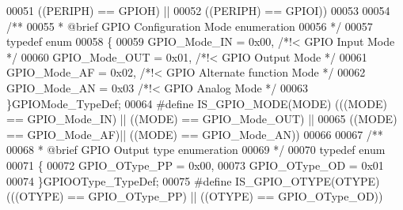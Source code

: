 \begin{DoxyCode}
00051                                     \textcolor{preprocessor}{(}\textcolor{preprocessor}{(}\textcolor{preprocessor}{PERIPH}\textcolor{preprocessor}{)} \textcolor{preprocessor}{==} GPIOH\textcolor{preprocessor}{)} \textcolor{preprocessor}{||}
00052                                     \textcolor{preprocessor}{(}\textcolor{preprocessor}{(}\textcolor{preprocessor}{PERIPH}\textcolor{preprocessor}{)} \textcolor{preprocessor}{==} GPIOI\textcolor{preprocessor}{)}\textcolor{preprocessor}{)}
00053 
00054 \textcolor{comment}{/** }
00055 \textcolor{comment}{  * @brief  GPIO Configuration Mode enumeration }
00056 \textcolor{comment}{  */}
00057 \textcolor{keyword}{typedef} \textcolor{keyword}{enum}
00058 \{
00059   GPIO_Mode_IN   = 0x00, \textcolor{comment}{/*!< GPIO Input Mode */}
00060   GPIO_Mode_OUT  = 0x01, \textcolor{comment}{/*!< GPIO Output Mode */}
00061   GPIO_Mode_AF   = 0x02, \textcolor{comment}{/*!< GPIO Alternate function Mode */}
00062   GPIO_Mode_AN   = 0x03  \textcolor{comment}{/*!< GPIO Analog Mode */}
00063 \}GPIOMode\_TypeDef;
00064 \textcolor{preprocessor}{#}\textcolor{preprocessor}{define} \textcolor{preprocessor}{IS\_GPIO\_MODE}\textcolor{preprocessor}{(}\textcolor{preprocessor}{MODE}\textcolor{preprocessor}{)} \textcolor{preprocessor}{(}\textcolor{preprocessor}{(}\textcolor{preprocessor}{(}\textcolor{preprocessor}{MODE}\textcolor{preprocessor}{)} \textcolor{preprocessor}{==} \textcolor{preprocessor}{GPIO\_Mode\_IN}\textcolor{preprocessor}{)}  \textcolor{preprocessor}{||} \textcolor{preprocessor}{(}\textcolor{preprocessor}{(}\textcolor{preprocessor}{MODE}\textcolor{preprocessor}{)} \textcolor{preprocessor}{==} \textcolor{preprocessor}{GPIO\_Mode\_OUT}\textcolor{preprocessor}{)} \textcolor{preprocessor}{||}
00065                             \textcolor{preprocessor}{(}\textcolor{preprocessor}{(}\textcolor{preprocessor}{MODE}\textcolor{preprocessor}{)} \textcolor{preprocessor}{==} \textcolor{preprocessor}{GPIO\_Mode\_AF}\textcolor{preprocessor}{)}\textcolor{preprocessor}{||} \textcolor{preprocessor}{(}\textcolor{preprocessor}{(}\textcolor{preprocessor}{MODE}\textcolor{preprocessor}{)} \textcolor{preprocessor}{==} \textcolor{preprocessor}{GPIO\_Mode\_AN}\textcolor{preprocessor}{)}\textcolor{preprocessor}{)}
00066 
00067 \textcolor{comment}{/** }
00068 \textcolor{comment}{  * @brief  GPIO Output type enumeration }
00069 \textcolor{comment}{  */}
00070 \textcolor{keyword}{typedef} \textcolor{keyword}{enum}
00071 \{
00072   GPIO_OType_PP = 0x00,
00073   GPIO_OType_OD = 0x01
00074 \}GPIOOType\_TypeDef;
00075 \textcolor{preprocessor}{#}\textcolor{preprocessor}{define} \textcolor{preprocessor}{IS\_GPIO\_OTYPE}\textcolor{preprocessor}{(}\textcolor{preprocessor}{OTYPE}\textcolor{preprocessor}{)} \textcolor{preprocessor}{(}\textcolor{preprocessor}{(}\textcolor{preprocessor}{(}\textcolor{preprocessor}{OTYPE}\textcolor{preprocessor}{)} \textcolor{preprocessor}{==} \textcolor{preprocessor}{GPIO\_OType\_PP}\textcolor{preprocessor}{)} \textcolor{preprocessor}{||} \textcolor{preprocessor}{(}\textcolor{preprocessor}{(}\textcolor{preprocessor}{OTYPE}\textcolor{preprocessor}{)} \textcolor{preprocessor}{==} \textcolor{preprocessor}{GPIO\_OType\_OD}\textcolor{preprocessor}{)}\textcolor{preprocessor}{)}

\end{DoxyCode}
